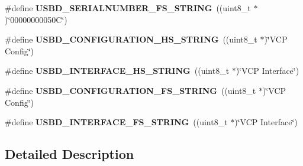 \begin{DoxyCompactItemize}
\item 
\hypertarget{group__USB__String__Descriptors_gac1914d1da0e15c46d3616a5877d7d0b6}{\#define {\bfseries U\-S\-B\-D\-\_\-\-S\-E\-R\-I\-A\-L\-N\-U\-M\-B\-E\-R\-\_\-\-F\-S\-\_\-\-S\-T\-R\-I\-N\-G}~((uint8\-\_\-t $\ast$)\char`\"{}00000000050\-C\char`\"{})}\label{group__USB__String__Descriptors_gac1914d1da0e15c46d3616a5877d7d0b6}

\item 
\hypertarget{group__USB__String__Descriptors_gaf219a547a6ee056876567b46ff3f8981}{\#define {\bfseries U\-S\-B\-D\-\_\-\-C\-O\-N\-F\-I\-G\-U\-R\-A\-T\-I\-O\-N\-\_\-\-H\-S\-\_\-\-S\-T\-R\-I\-N\-G}~((uint8\-\_\-t $\ast$)\char`\"{}V\-C\-P Config\char`\"{})}\label{group__USB__String__Descriptors_gaf219a547a6ee056876567b46ff3f8981}

\item 
\hypertarget{group__USB__String__Descriptors_ga0a2f934bba3039d6d387b2a71e6e5e44}{\#define {\bfseries U\-S\-B\-D\-\_\-\-I\-N\-T\-E\-R\-F\-A\-C\-E\-\_\-\-H\-S\-\_\-\-S\-T\-R\-I\-N\-G}~((uint8\-\_\-t $\ast$)\char`\"{}V\-C\-P Interface\char`\"{})}\label{group__USB__String__Descriptors_ga0a2f934bba3039d6d387b2a71e6e5e44}

\item 
\hypertarget{group__USB__String__Descriptors_ga2e4446fa70cda1fdfc88b2d85725cee4}{\#define {\bfseries U\-S\-B\-D\-\_\-\-C\-O\-N\-F\-I\-G\-U\-R\-A\-T\-I\-O\-N\-\_\-\-F\-S\-\_\-\-S\-T\-R\-I\-N\-G}~((uint8\-\_\-t $\ast$)\char`\"{}V\-C\-P Config\char`\"{})}\label{group__USB__String__Descriptors_ga2e4446fa70cda1fdfc88b2d85725cee4}

\item 
\hypertarget{group__USB__String__Descriptors_gaedb1101a7b7b1be9349051d972e8b51c}{\#define {\bfseries U\-S\-B\-D\-\_\-\-I\-N\-T\-E\-R\-F\-A\-C\-E\-\_\-\-F\-S\-\_\-\-S\-T\-R\-I\-N\-G}~((uint8\-\_\-t $\ast$)\char`\"{}V\-C\-P Interface\char`\"{})}\label{group__USB__String__Descriptors_gaedb1101a7b7b1be9349051d972e8b51c}

\end{DoxyCompactItemize}


\subsection{Detailed Description}
